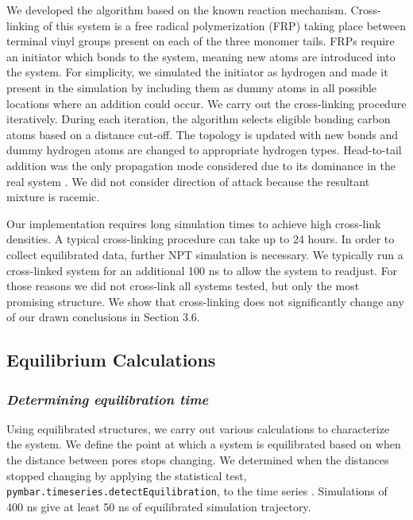 \documentclass[journal=jpcbfk,manusciprt=article]{achemso}
\begin{document}
  We developed the algorithm based on the known reaction mechanism.
  Cross-linking of this system is a free radical polymerization (FRP) taking
  place between terminal vinyl groups present on each of the three monomer tails.
  FRPs require an initiator which bonds to the system, meaning new atoms are
  introduced into the system. For simplicity, we simulated the initiator as
  hydrogen and made it present in the simulation by including them as dummy atoms
  in all possible locations where an addition could occur. We carry out the
  cross-linking procedure iteratively. During each iteration, the algorithm
  selects eligible bonding carbon atoms based on a distance cut-off. The topology
  is updated with new bonds and dummy hydrogen atoms are changed to appropriate
  hydrogen types.  Head-to-tail addition was the only propagation mode considered
  due to its dominance in the real system \cite{young_introduction_2011}. We did
  not consider direction of attack because the resultant mixture is racemic.

  Our implementation requires long simulation times to achieve high cross-link 
  densities. A typical cross-linking procedure can take up to 24 hours. In
  order to collect equilibrated data, further NPT simulation is necessary. We
  typically run a cross-linked system for an additional 100 ns to allow the system
  to readjust. For those reasons we did not cross-link all systems tested, but only
  the most promising structure. We show that cross-linking does not significantly
  change any of our drawn conclusions in Section 3.6.

  \subsection{Equilibrium Calculations}

  \subsubsection{\textit{Determining equilibration time}}

  Using equilibrated structures, we carry out various calculations to
  characterize the system. We define the point at which a system is equilibrated
  based on when the distance between pores stops changing.  We determined when
  the distances stopped changing by applying the statistical test,
  \texttt{pymbar.timeseries.detectEquilibration}, to the time series
  \cite{chodera_simple_2016,shirts_statistically_2008}. Simulations of 400 ns
  give at least 50 ns of equilibrated simulation trajectory.
\end{document}
